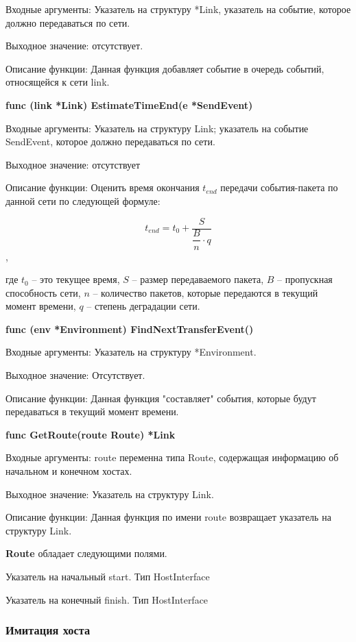 Входные аргументы: Указатель на структуру *Link, указатель на событие, которое должно передаваться по сети.

Выходное значение: отсутствует.

Описание функции: Данная функция добавляет событие в очередь событий, относящейся к сети link. 


\textbf{func (link *Link) EstimateTimeEnd(e *SendEvent)}

Входные аргументы: Указатель на структуру Link; указатель на событие SendEvent, которое должно передаваться по сети.

Выходное значение: отсутствует

Описание функции: Оценить время окончания  $t_{end}$ передачи события-пакета по данной сети по следующей формуле:

\[ t_{end} = t_0 + \dfrac{S}{\dfrac{B}{n}  \cdot q }  \], 

где $t_0$ -- это текущее время, \(S\) -- размер передаваемого пакета,  \(B\) -- пропускная способность сети, \(n\) -- количество пакетов, которые передаются в текущий момент времени,  \(q\) -- степень деградации сети. 


\textbf{func (env *Environment) FindNextTransferEvent()}

Входные аргументы: Указатель на структуру *Environment.

Выходное значение: Отсутствует. 

Описание функции: Данная функция "составляет" события, которые будут передаваться в текущий момент времени.  


\textbf{func GetRoute(route Route) *Link}

Входные аргументы: route переменна типа Route, содержащая информацию об начальном и конечном хостах.

Выходное значение: Указатель на структуру Link. 

Описание функции: Данная функция по имени route возвращает указатель на структуру Link.


\textbf{Route} обладает следующими полями.

Указатель на начальный	start. Тип  HostInterface

Указатель на конечный finish. Тип HostInterface

\subsubsection{Имитация хоста}


